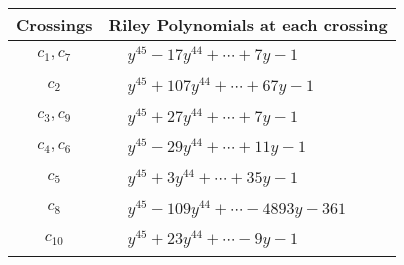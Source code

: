 \documentclass[1p]{elsarticle_modified}
\theoremstyle{definition}
\begin{document}
\begin{tabular}{m{50pt}|m{274pt}}
Crossings & \hspace{64pt}Riley Polynomials at each crossing \\
\hline $$\begin{aligned}c_{1},c_{7}\end{aligned}$$&$\begin{aligned}
&y^{45}-17 y^{44}+\cdots+7 y-1
\end{aligned}$\\
\hline $$\begin{aligned}c_{2}\end{aligned}$$&$\begin{aligned}
&y^{45}+107 y^{44}+\cdots+67 y-1
\end{aligned}$\\
\hline $$\begin{aligned}c_{3},c_{9}\end{aligned}$$&$\begin{aligned}
&y^{45}+27 y^{44}+\cdots+7 y-1
\end{aligned}$\\
\hline $$\begin{aligned}c_{4},c_{6}\end{aligned}$$&$\begin{aligned}
&y^{45}-29 y^{44}+\cdots+11 y-1
\end{aligned}$\\
\hline $$\begin{aligned}c_{5}\end{aligned}$$&$\begin{aligned}
&y^{45}+3 y^{44}+\cdots+35 y-1
\end{aligned}$\\
\hline $$\begin{aligned}c_{8}\end{aligned}$$&$\begin{aligned}
&y^{45}-109 y^{44}+\cdots-4893 y-361
\end{aligned}$\\
\hline $$\begin{aligned}c_{10}\end{aligned}$$&$\begin{aligned}
&y^{45}+23 y^{44}+\cdots-9 y-1
\end{aligned}$\\
\hline
\end{tabular}
\vskip 2pc
\end{document}
